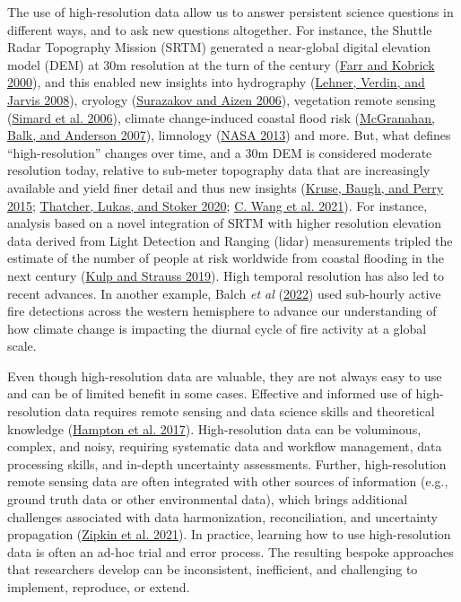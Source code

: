 \documentclass[
  12pt,
]{article}
\begin{document}
The use of high-resolution data allow us to answer persistent science
questions in different ways, and to ask new questions altogether. For
instance, the Shuttle Radar Topography Mission (SRTM) generated a
near-global digital elevation model (DEM) at 30m resolution at the turn
of the century (\protect\hyperlink{ref-farr2000shuttle}{Farr and Kobrick
2000}), and this enabled new insights into hydrography
(\protect\hyperlink{ref-lehner2008new}{Lehner, Verdin, and Jarvis
2008}), cryology
(\protect\hyperlink{ref-surazakov2006estimating}{Surazakov and Aizen
2006}), vegetation remote sensing
(\protect\hyperlink{ref-simard2006mapping}{Simard et al. 2006}), climate
change-induced coastal flood risk
(\protect\hyperlink{ref-mcgranahan2007rising}{McGranahan, Balk, and
Anderson 2007}), limnology (\protect\hyperlink{ref-nasa2013}{NASA 2013})
and more. But, what defines ``high-resolution'' changes over time, and a
30m DEM is considered moderate resolution today, relative to sub-meter
topography data that are increasingly available and yield finer detail
and thus new insights
(\protect\hyperlink{ref-kruse2015validation}{Kruse, Baugh, and Perry
2015}; \protect\hyperlink{ref-thatcher20203d}{Thatcher, Lukas, and
Stoker 2020}; \protect\hyperlink{ref-wang2021flood}{C. Wang et al.
2021}). For instance, analysis based on a novel integration of SRTM with
higher resolution elevation data derived from Light Detection and
Ranging (lidar) measurements tripled the estimate of the number of
people at risk worldwide from coastal flooding in the next century
(\protect\hyperlink{ref-kulp2019new}{Kulp and Strauss 2019}). High
temporal resolution has also led to recent advances. In another example,
Balch \emph{et al} (\protect\hyperlink{ref-balch_warming_2022}{2022})
used sub-hourly active fire detections across the western hemisphere to
advance our understanding of how climate change is impacting the diurnal
cycle of fire activity at a global scale.

Even though high-resolution data are valuable, they are not always easy
to use and can be of limited benefit in some cases. Effective and
informed use of high-resolution data requires remote sensing and data
science skills and theoretical knowledge
(\protect\hyperlink{ref-hampton2017skills}{Hampton et al. 2017}).
High-resolution data can be voluminous, complex, and noisy, requiring
systematic data and workflow management, data processing skills, and
in-depth uncertainty assessments. Further, high-resolution remote
sensing data are often integrated with other sources of information
(e.g., ground truth data or other environmental data), which brings
additional challenges associated with data harmonization,
reconciliation, and uncertainty propagation
(\protect\hyperlink{ref-zipkin2021addressing}{Zipkin et al. 2021}). In
practice, learning how to use high-resolution data is often an ad-hoc
trial and error process. The resulting bespoke approaches that
researchers develop can be inconsistent, inefficient, and challenging to
implement, reproduce, or extend.
\end{document}
